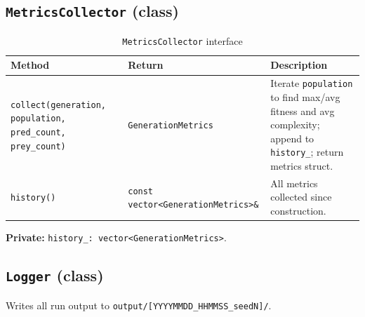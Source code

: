\subsection{\texttt{MetricsCollector} (class)}

\begin{table}[H]
\centering\small
\caption{\texttt{MetricsCollector} interface}
\begin{tabularx}{\textwidth}{@{}llX@{}}
\toprule
\textbf{Method} & \textbf{Return} & \textbf{Description} \\
\midrule
\texttt{collect(generation, population, pred\_count, prey\_count)} &
  \texttt{GenerationMetrics} &
  Iterate \texttt{population} to find max/avg fitness and avg complexity;
  append to \texttt{history\_}; return metrics struct. \\
\texttt{history()} &
  \texttt{const vector<GenerationMetrics>\&} &
  All metrics collected since construction. \\
\bottomrule
\end{tabularx}
\end{table}

\textbf{Private:} \texttt{history\_: vector<GenerationMetrics>}.

\subsection{\texttt{Logger} (class)}

Writes all run output to \texttt{output/[YYYYMMDD\_HHMMSS\_seedN]/}.


